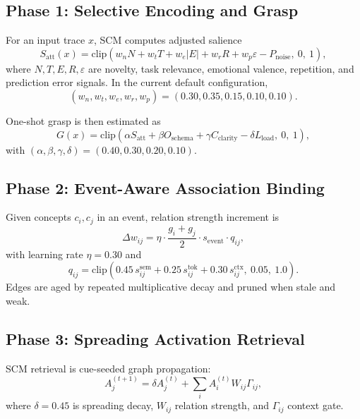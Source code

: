 \documentclass[11pt,a4paper]{article}
\begin{document}
\subsection{Phase 1: Selective Encoding and Grasp}
For an input trace $x$, SCM computes adjusted salience
\begin{equation}
S_{\text{att}}(x) = \mathrm{clip}\left(
w_n N + w_t T + w_e |E| + w_r R + w_p \varepsilon - P_{\text{noise}},\ 0,\ 1
\right),
\label{eq:salience}
\end{equation}
where $N, T, E, R, \varepsilon$ are novelty, task relevance, emotional valence, repetition, and prediction error signals. In the current default configuration,
\[
(w_n, w_t, w_e, w_r, w_p) = (0.30, 0.35, 0.15, 0.10, 0.10).
\]

One-shot grasp is then estimated as
\begin{equation}
G(x) = \mathrm{clip}\left(
\alpha S_{\text{att}} + \beta O_{\text{schema}} + \gamma C_{\text{clarity}} - \delta L_{\text{load}},\ 0,\ 1
\right),
\label{eq:grasp}
\end{equation}
with $(\alpha,\beta,\gamma,\delta)=(0.40,0.30,0.20,0.10)$.

\subsection{Phase 2: Event-Aware Association Binding}
Given concepts $c_i,c_j$ in an event, relation strength increment is
\begin{equation}
\Delta w_{ij} = \eta \cdot \frac{g_i + g_j}{2} \cdot s_{\text{event}} \cdot q_{ij},
\label{eq:assoc_delta}
\end{equation}
with learning rate $\eta=0.30$ and
\begin{equation}
q_{ij} = \mathrm{clip}\left(0.45 \, s_{ij}^{\text{sem}} + 0.25 \, s_{ij}^{\text{tok}} + 0.30 \, s_{ij}^{\text{ctx}},\ 0.05,\ 1.0\right).
\label{eq:assoc_signal}
\end{equation}
Edges are aged by repeated multiplicative decay and pruned when stale and weak.

\subsection{Phase 3: Spreading Activation Retrieval}
SCM retrieval is cue-seeded graph propagation:
\begin{equation}
A_j^{(t+1)} = \delta A_j^{(t)} + \sum_{i} A_i^{(t)} W_{ij}\Gamma_{ij},
\label{eq:spreading}
\end{equation}
where $\delta=0.45$ is spreading decay, $W_{ij}$ relation strength, and $\Gamma_{ij}$ context gate.
\end{document}
